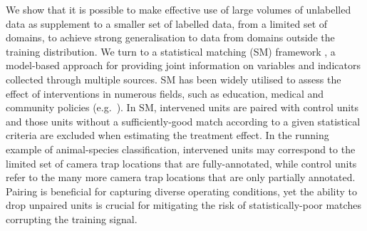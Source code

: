 We show that it is possible to make effective use of large volumes of unlabelled data
as supplement to a smaller set of labelled data, from a limited set of domains, to achieve
strong generalisation to data from domains outside the training distribution.
%
We turn to a statistical matching (SM) framework \cite{RomInsShaQua22,rosenbaum1985constructing,
rubin1973matching}, a model-based approach for providing joint information on variables and
indicators collected through multiple sources. 
%
SM has been widely utilised to assess the effect of interventions in numerous fields, such as
education, medical and community policies (e.g.\ \cite{biglan2000value, christian2010prenatal}).  
%
In SM, intervened units are paired with control units and those units without a sufficiently-good
match according to a given statistical criteria are excluded when estimating the treatment effect.
%
In the running example of animal-species classification, intervened units may correspond to the
limited set of camera trap locations that are fully-annotated, while control units refer to the
many more camera trap locations that are only partially annotated.
%
Pairing is beneficial for capturing diverse operating conditions, yet the ability to drop unpaired
units is crucial for mitigating the risk of statistically-poor matches corrupting the training
signal.

